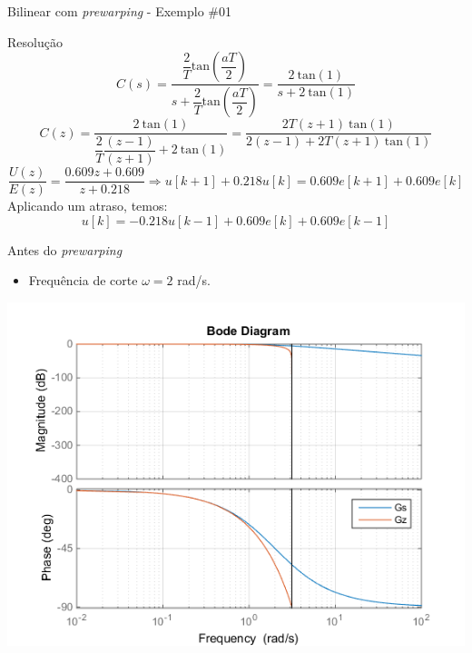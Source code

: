 \begin{frame}{Bilinear com \textit{prewarping} - Exemplo \#01}
\begin{block}{Resolução}
    \[ C(s)=\dfrac{\dfrac{2}{T} \text{tan} \left(\dfrac{aT}{2}\right)}{s+\dfrac{2}{T} \text{tan} \left(\dfrac{aT}{2}\right)} = \dfrac{2 \ \text{tan}(1)}{s+2 \ \text{tan}(1)} \]
	\[ C(z)=\dfrac{2 \ \text{tan}(1)}{\dfrac{2}{T}\dfrac{(z-1)}{(z+1)}+2 \ \text{tan}(1)}=\dfrac{2T(z+1) \ \text{tan}(1)}{2(z-1)+2T(z+1) \ \text{tan}(1)} \]
	\[ \dfrac{U(z)}{E(z)}=\dfrac{\num{0,609}z+\num{0,609}}{z + \num{0,218}}\Rightarrow u[k+1] + \num{0,218} u[k] =\num{0,609}e[k+1]+\num{0,609}e[k] \]
	Aplicando um atraso, temos:
	\[ u[k]=-\num{0,218}u[k-1]+\num{0,609}e[k]+\num{0,609}e[k-1] \]
\end{block}
\end{frame}

\cprotect{}

\begin{frame}{\MATLAB}
\begin{block}{Antes do \textit{prewarping}}
\begin{itemize}
    \item Frequência de corte $\omega = 2$ rad/s.
\end{itemize}
\end{block}
\centerline{\includegraphics[width=0.7\linewidth]{Figuras/Ch08/fig5.png}}
\end{frame}

